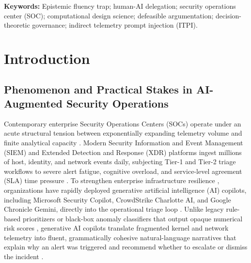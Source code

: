 \documentclass[11pt,a4paper]{article}
\begin{document}
\begin{abstract}
Reconnaissance tactics) on SALAD-SOC, and $\text{AUROC} = 0.9963$ ($95\%\text{ CI}: [0.9961, 0.9969]$, $99.93\%$ hostile recall, $99.99\%$ RedTeam recall) on LMD-2023. Trace-driven decision-theoretic evaluation identifies the exact cost-ratio dominance boundary ($\kappa^* = 39.64$ on low-base-rate OTRF vs.\ $\kappa^* = 1.68$ on SALAD-SOC at $\lambda_F = 0.40$), establishes an interior optimal gating threshold under unified endogenous habituation, and shows that selective DECS gating cuts warning banner volume by $79.87\%$ to $95.92\%$ while reducing expected operational loss by $30.16\%$ to $60.77\%$ in enterprise SIEM triage.
\end{abstract}

\medskip
\noindent\textbf{Keywords:} Epistemic fluency trap; human-AI delegation; security operations center (SOC); computational design science; defeasible argumentation; decision-theoretic governance; indirect telemetry prompt injection (ITPI).

\section{Introduction}
\label{sec:intro}

\subsection{Phenomenon and Practical Stakes in AI-Augmented Security Operations}
\label{subsec:phenomenon}

Contemporary enterprise Security Operations Centers (SOCs) operate under an acute structural tension between exponentially expanding telemetry volume and finite analytical capacity \citep{tariq2025alert, tilbury2024automation, bartal2026alert}. Modern Security Information and Event Management (SIEM) and Extended Detection and Response (XDR) platforms ingest millions of host, identity, and network events daily, subjecting Tier-1 and Tier-2 triage workflows to severe alert fatigue, cognitive overload, and service-level agreement (SLA) time pressure \citep{cram2021technostress, hsu2024proactive, darcy2014stress, liu2020centralized}. To strengthen enterprise infrastructure resilience \citep{li2021roles, ebrahimi2020semi, ampel2024improving}, organizations have rapidly deployed generative artificial intelligence (AI) copilots, including Microsoft Security Copilot, CrowdStrike Charlotte AI, and Google Chronicle Gemini, directly into the operational triage loop \citep{srinivas2025ai, ansari2026partner}. Unlike legacy rule-based prioritizers or black-box anomaly classifiers that output opaque numerical risk scores \citep{li2022assessing, tutun2024explainable}, generative AI copilots translate fragmented kernel and network telemetry into fluent, grammatically cohesive natural-language narratives that explain why an alert was triggered and recommend whether to escalate or dismiss the incident \citep{naseer2023enabling, bag2025enhancing, taudien2026effect}.
\end{document}
